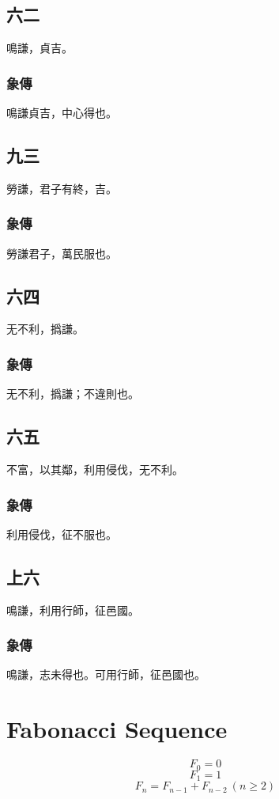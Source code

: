 \documentclass[12pt, a4paper]{article}
\begin{document}
\subsection{六二}
鳴謙，貞吉。
\subsubsection{象傳}
鳴謙貞吉，中心得也。
\subsection{九三}
勞謙，君子有終，吉。
\subsubsection{象傳}
勞謙君子，萬民服也。
\subsection{六四}
无不利，撝謙。
\subsubsection{象傳}
无不利，撝謙；不違則也。
\subsection{六五}
不富，以其鄰，利用侵伐，无不利。
\subsubsection{象傳}
利用侵伐，征不服也。
\subsection{上六}
鳴謙，利用行師，征邑國。
\subsubsection{象傳}
鳴謙，志未得也。可用行師，征邑國也。
\pagebreak
\section{Fabonacci Sequence}
\[
	F_0 = 0
\]
\[
	F_1 = 1
\]
\[
	F_n = F_{n-1} + F_{n-2}\ (n \geq 2)
\]
\end{document}
